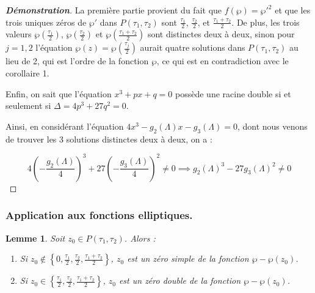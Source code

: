 \documentclass[12pt]{article}
\newtheorem{lemma}{Lemme}
\begin{document}
                    \begin{proof}[\textbf{Démonstration}] 
                    La première partie provient du fait que \(f(\wp) = \wp'^2\) et que les trois uniques zéros de \(\wp'\) dans \(P(\tau_1, \tau_2)\) sont 
                    \(\frac{\tau_1}{2}\), \(\frac{\tau_2}{2}\), et \(\frac{\tau_1 + \tau_2}{2}\). De plus, les trois valeurs \(\wp\left(\frac{\tau_1}{2}\right)\), \(\wp\left(\frac{\tau_2}{2}\right)\) et \(\wp\left(\frac{\tau_1 + \tau_2}{2}\right)\)
                    sont distinctes deux à deux, sinon pour \(j = 1, 2\) l'équation \(\wp(z) = \wp(\frac{\tau_j}{2})\) aurait quatre solutions dans \(P(\tau_1, \tau_2)\) au lieu de 2,
                    qui est l'ordre de la fonction \(\wp\), ce qui est en contradiction avec le corollaire 1.
                    
                    Enfin, on sait que l'équation \(x^3 + px + q = 0\) possède une racine double si et seulement si \(\Delta = 4p^3 + 27q^2 = 0\).
                    
                    Ainsi, en considérant l'équation \(4x^3 - g_2(\Lambda)x - g_3(\Lambda) = 0\), dont nous venons de trouver les 3 solutions distinctes deux à deux, on a :
                    
                    \[
                    4\left(-\frac{g_2(\Lambda)}{4}\right)^3 + 27\left(-\frac{g_3(\Lambda)}{4}\right)^2 \neq 0 \implies g_2(\Lambda)^3 - 27g_3(\Lambda)^2 \neq 0
                    \]
                    \end{proof}
                    \subsubsection{Application aux fonctions elliptiques.}
                    \begin{lemma}
                    Soit \(z_0 \in P(\tau_1, \tau_2)\). Alors :
                    \begin{enumerate}
                        \item Si \(z_0 \notin \left\{ 0, \frac{\tau_1}{2}, \frac{\tau_2}{2}, \frac{\tau_1 + \tau_2}{2} \right\}\), \(z_0\) est un zéro simple de la fonction \(\wp - \wp(z_0)\).
                        \item Si \(z_0 \in \left\{ \frac{\tau_1}{2}, \frac{\tau_2}{2}, \frac{\tau_1 + \tau_2}{2} \right\}\), \(z_0\) est un zéro double de la fonction \(\wp - \wp(z_0)\).
                    \end{enumerate}
                    \end{lemma}
                    
\end{document}
